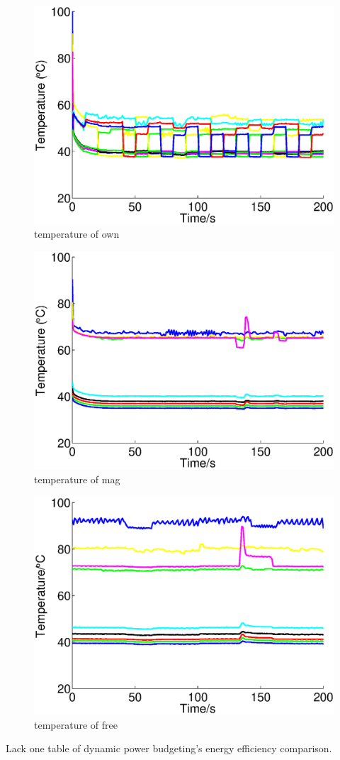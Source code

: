 \begin{figure}
\centering
\includegraphics[width=1\linewidth]{fig/tem_own.eps}
\caption{temperature of own}
\end{figure}

\begin{figure}
\centering
\includegraphics[width=1\linewidth]{fig/tem_mag.eps}
\caption{temperature of mag}
\end{figure}

\begin{figure}
\centering
\includegraphics[width=1\linewidth]{fig/tem_free.eps}
\caption{temperature of free}
\end{figure}

Lack one table of dynamic power budgeting's energy efficiency comparison.
